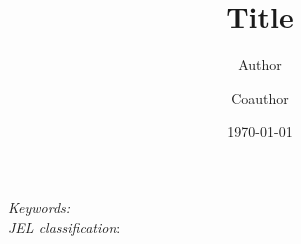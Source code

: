 \documentclass[12pt]{scrartcl}
\begin{document}
 
\singlespace
\title{Title}

\author[1]{Author}
\author[2]{Coauthor}


\date{\today}
\maketitle
\thispagestyle{empty}

\begin{center}
\begin{abstract}

\end{abstract}
\end{center}


\vfill \noindent\textit{Keywords:}   \\
\noindent\textit{JEL classification}:  




\newpage
\doublespace



 




\newpage
\singlespacing



\clearpage







\newpage
\appendix
\appendixpage

\end{document}
